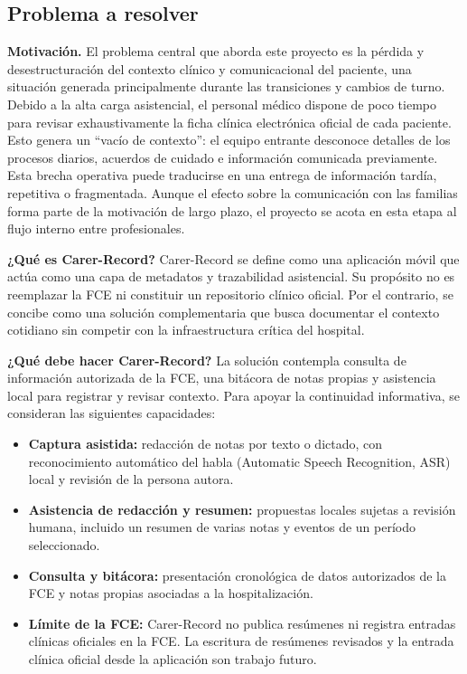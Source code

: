 \subsection{Problema a resolver}

\textbf{Motivación.} El problema central que aborda este proyecto es la pérdida y desestructuración del contexto clínico y comunicacional del paciente, una situación generada principalmente durante las transiciones y cambios de turno. Debido a la alta carga asistencial, el personal médico dispone de poco tiempo para revisar exhaustivamente la ficha clínica electrónica oficial de cada paciente. Esto genera un ``vacío de contexto'': el equipo entrante desconoce detalles de los procesos diarios, acuerdos de cuidado e información comunicada previamente. Esta brecha operativa puede traducirse en una entrega de información tardía, repetitiva o fragmentada. Aunque el efecto sobre la comunicación con las familias forma parte de la motivación de largo plazo, el proyecto se acota en esta etapa al flujo interno entre profesionales.

\textbf{¿Qué es Carer-Record?} Carer-Record se define como una aplicación móvil que actúa como una capa de metadatos y trazabilidad asistencial. Su propósito no es reemplazar la FCE ni constituir un repositorio clínico oficial. Por el contrario, se concibe como una solución complementaria que busca documentar el contexto cotidiano sin competir con la infraestructura crítica del hospital.

\textbf{¿Qué debe hacer Carer-Record?} La solución contempla consulta de información autorizada de la FCE, una bitácora de notas propias y asistencia local para registrar y revisar contexto. Para apoyar la continuidad informativa, se consideran las siguientes capacidades:

\begin{itemize}
    \item \textbf{Captura asistida:} redacción de notas por texto o dictado, con reconocimiento automático del habla (Automatic Speech Recognition, ASR) local y revisión de la persona autora.
    
    \item \textbf{Asistencia de redacción y resumen:} propuestas locales sujetas a revisión humana, incluido un resumen de varias notas y eventos de un período seleccionado.
    \item \textbf{Consulta y bitácora:} presentación cronológica de datos autorizados de la FCE y notas propias asociadas a la hospitalización.
    
    \item \textbf{Límite de la FCE:} Carer-Record no publica resúmenes ni registra entradas clínicas oficiales en la FCE. La escritura de resúmenes revisados y la entrada clínica oficial desde la aplicación son trabajo futuro.
\end{itemize}
